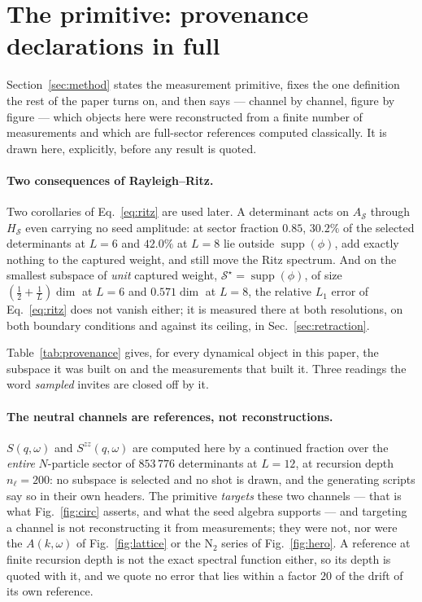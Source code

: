 \section{The primitive: provenance declarations in full}
\label{sm:method}

Section~\ref{sec:method} states the measurement primitive, fixes the one definition the rest of the paper turns on,
and then says --- channel by channel, figure by figure --- which objects here were reconstructed from a
finite number of measurements and which are full-sector references computed classically. It is drawn here,
explicitly, before any result is quoted.

\paragraph{Two consequences of Rayleigh--Ritz.} Two corollaries of Eq.~\eqref{eq:ritz} are
used later. A determinant acts on $A_{\mathcal S}$ through $H_{\mathcal S}$ even carrying no seed
amplitude: at sector fraction $0.85$, $30.2\%$ of the selected determinants at $L=6$ and $42.0\%$ at
$L=8$ lie outside $\operatorname{supp}(\phi)$, add exactly nothing to the captured weight, and still
move the Ritz spectrum. And on the smallest subspace of \emph{unit} captured weight, $\mathcal
S^{\star}=\operatorname{supp}(\phi)$, of size $(\tfrac12+\tfrac1L)\dim$ at $L=6$ and $0.571\dim$ at $L=8$, the relative $L_1$ error
of Eq.~\eqref{eq:ritz} does not vanish either; it is measured there at both resolutions, on both
boundary conditions and against its ceiling, in Sec.~\ref{sec:retraction}.

Table~\ref{tab:provenance} gives, for every dynamical object in this paper, the subspace it was built on
and the measurements that built it. Three readings the word \emph{sampled} invites are closed off by it.

\paragraph{The neutral channels are references, not reconstructions.} $S(q,\omega)$ and
$S^{zz}(q,\omega)$ are computed here by a continued fraction over the \emph{entire} $N$-particle sector
of $853\,776$ determinants at $L=12$, at recursion depth $n_\ell=200$: no subspace is selected and no
shot is drawn, and the generating scripts say so in their own headers. The primitive \emph{targets}
these two channels --- that is what Fig.~\ref{fig:circ} asserts, and what the seed algebra supports
--- and targeting a channel is not reconstructing it from measurements;
they were not, nor were the $A(k,\omega)$ of Fig.~\ref{fig:lattice} or the $\mathrm{N_2}$ series of
Fig.~\ref{fig:hero}. A reference at finite recursion depth is not the exact spectral function either, so
its depth is quoted with it, and we quote no error that lies within a factor $20$ of the drift of its
own reference.

